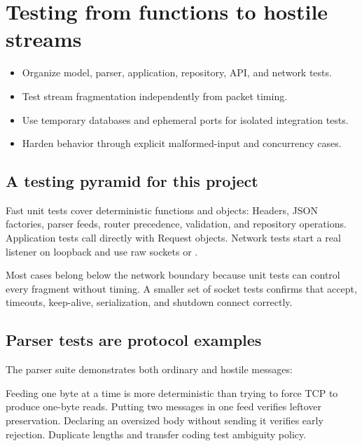 \chapter{Testing from functions to hostile streams}

\begin{objectives}
\begin{itemize}
  \item Organize model, parser, application, repository, API, and network tests.
  \item Test stream fragmentation independently from packet timing.
  \item Use temporary databases and ephemeral ports for isolated integration tests.
  \item Harden behavior through explicit malformed-input and concurrency cases.
\end{itemize}
\end{objectives}

\section{A testing pyramid for this project}

Fast unit tests cover deterministic functions and objects: Headers, JSON factories,
parser feeds, router precedence, validation, and repository operations. Application
tests call  directly with Request objects. Network tests start a
real listener on loopback and use raw sockets or .

Most cases belong below the network boundary because unit tests can control every
fragment without timing. A smaller set of socket tests confirms that accept,
timeouts, keep-alive, serialization, and shutdown connect correctly.

\section{Parser tests are protocol examples}

The parser suite demonstrates both ordinary and hostile messages:


Feeding one byte at a time is more deterministic than trying to force TCP to
produce one-byte reads. Putting two messages in one feed verifies leftover
preservation. Declaring an oversized body without sending it verifies early
rejection. Duplicate lengths and transfer coding test ambiguity policy.

